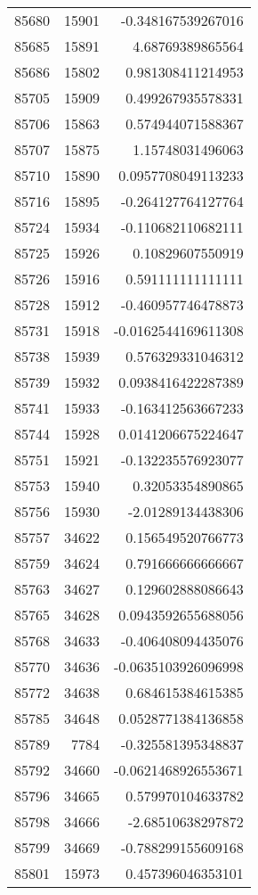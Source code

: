 \begin{tabular}{r | r | r}
85680 & 15901 & -0.348167539267016 \\
85685 & 15891 & 4.68769389865564 \\
85686 & 15802 & 0.981308411214953 \\
85705 & 15909 & 0.499267935578331 \\
85706 & 15863 & 0.574944071588367 \\
85707 & 15875 & 1.15748031496063 \\
85710 & 15890 & 0.0957708049113233 \\
85716 & 15895 & -0.264127764127764 \\
85724 & 15934 & -0.110682110682111 \\
85725 & 15926 & 0.10829607550919 \\
85726 & 15916 & 0.591111111111111 \\
85728 & 15912 & -0.460957746478873 \\
85731 & 15918 & -0.0162544169611308 \\
85738 & 15939 & 0.576329331046312 \\
85739 & 15932 & 0.0938416422287389 \\
85741 & 15933 & -0.163412563667233 \\
85744 & 15928 & 0.0141206675224647 \\
85751 & 15921 & -0.132235576923077 \\
85753 & 15940 & 0.32053354890865 \\
85756 & 15930 & -2.01289134438306 \\
85757 & 34622 & 0.156549520766773 \\
85759 & 34624 & 0.791666666666667 \\
85763 & 34627 & 0.129602888086643 \\
85765 & 34628 & 0.0943592655688056 \\
85768 & 34633 & -0.406408094435076 \\
85770 & 34636 & -0.0635103926096998 \\
85772 & 34638 & 0.684615384615385 \\
85785 & 34648 & 0.0528771384136858 \\
85789 & 7784 & -0.325581395348837 \\
85792 & 34660 & -0.0621468926553671 \\
85796 & 34665 & 0.579970104633782 \\
85798 & 34666 & -2.68510638297872 \\
85799 & 34669 & -0.788299155609168 \\
85801 & 15973 & 0.457396046353101 \\

\end{tabular}
